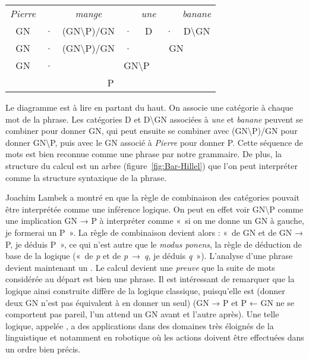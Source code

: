 {\ea\label{ex:Bar-Hillel}
   \settowidth{\tabcolsep}{~}
   \begin{tabular}[t]{@{}c c c c c c c@{}}
    {\textit{Pierre}} &   &  {\textit{mange}} & &    {\textit{une}} & &  {\textit{banane}}\\
    GN       & · & (GN{\textbackslash}P)/GN & · & D & · & D{\textbackslash}GN\\\cmidrule{5-7}
    GN       & · & (GN{\textbackslash}P)/GN & · & \multicolumn{3}{c}{GN}\\\cmidrule{3-7}
    GN       & · & \multicolumn{5}{c}{GN{\textbackslash}P}\\\midrule
    \multicolumn{7}{c}{P}
   \end{tabular}
\z

Le diagramme est à lire en partant du haut. On associe une catégorie à chaque mot de la phrase. Les catégories D et D{\textbackslash}GN associées à \textit{une} et \textit{banane} peuvent se combiner pour donner GN, qui peut ensuite se combiner avec (GN{\textbackslash}P)/GN pour donner GN{\textbackslash}P, puis avec le GN associé à \textit{Pierre} pour donner P.
   Cette séquence de mots est bien reconnue comme une phrase par notre grammaire. De plus, la structure du calcul est un arbre (figure~\ref{fig:Bar-Hillel}) que l’on peut interpréter comme la structure syntaxique de la phrase.

    Joachim Lambek a montré en \citeyear{lambek1958mathematics} que la règle de combinaison des catégories pouvait être interprétée comme une inférence logique. On peut en effet voir GN{\textbackslash}P comme une implication GN → P à interpréter comme «~si on me donne un GN à gauche, je formerai un P~». La règle de combinaison devient alors : «~de GN et de GN → P, je déduis P~», ce qui n’est autre que le \textit{modus ponens}, la règle de déduction de base de la logique («~de \textit{p} et de \textit{p}~→~\textit{q}, je déduis \textit{q}~»). L’analyse d’une phrase devient maintenant un . Le calcul devient une \textit{preuve} que la suite de mots considérée au départ est bien une phrase. Il est intéressant de remarquer que la logique ainsi construite diffère de la logique classique, puisqu’elle est  (donner deux GN n’est pas équivalent à en donner un seul)  (GN → P et P ← GN ne se comportent pas pareil, l’un attend un GN avant et l’autre après). Une telle logique, appelée , a des applications dans des domaines très éloignés de la linguistique et notamment en robotique où les actions doivent être effectuées dans un ordre bien précis.

}
